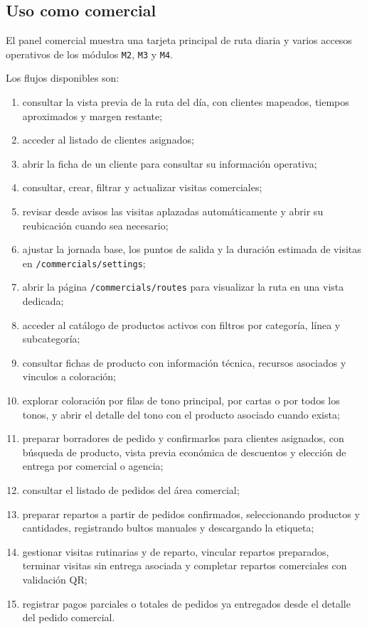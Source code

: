 \subsection{Uso como comercial}

El panel comercial muestra una tarjeta principal de ruta diaria y varios accesos operativos de los módulos \texttt{M2}, \texttt{M3} y \texttt{M4}.

Los flujos disponibles son:

\begin{enumerate}
    \item consultar la vista previa de la ruta del día, con clientes mapeados, tiempos aproximados y margen restante;
    \item acceder al listado de clientes asignados;
    \item abrir la ficha de un cliente para consultar su información operativa;
    \item consultar, crear, filtrar y actualizar visitas comerciales;
    \item revisar desde avisos las visitas aplazadas automáticamente y abrir su reubicación cuando sea necesario;
    \item ajustar la jornada base, los puntos de salida y la duración estimada de visitas en \texttt{/commercials/settings};
    \item abrir la página \texttt{/commercials/routes} para visualizar la ruta en una vista dedicada;
    \item acceder al catálogo de productos activos con filtros por categoría, línea y subcategoría;
    \item consultar fichas de producto con información técnica, recursos asociados y vinculos a coloración;
    \item explorar coloración por filas de tono principal, por cartas o por todos los tonos, y abrir el detalle del tono con el producto asociado cuando exista;
    \item preparar borradores de pedido y confirmarlos para clientes asignados, con búsqueda de producto, vista previa económica de descuentos y elección de entrega por comercial o agencia;
    \item consultar el listado de pedidos del área comercial;
    \item preparar repartos a partir de pedidos confirmados, seleccionando productos y cantidades, registrando bultos manuales y descargando la etiqueta;
    \item gestionar visitas rutinarias y de reparto, vincular repartos preparados, terminar visitas sin entrega asociada y completar repartos comerciales con validación QR;
    \item registrar pagos parciales o totales de pedidos ya entregados desde el detalle del pedido comercial.
\end{enumerate}

